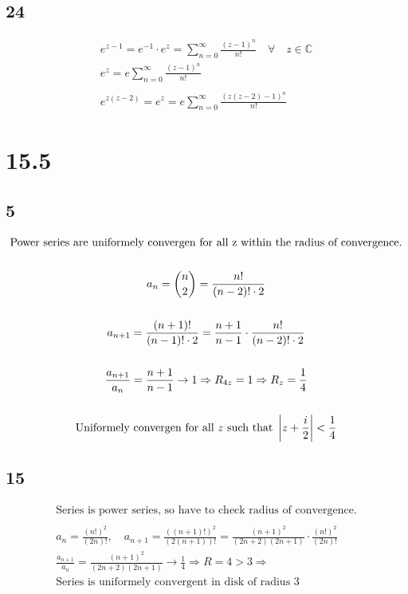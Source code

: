 \subsection*{24}


\begin{gather*}
	e^{z - 1} = e^{-1} \cdot e^z = \sum_{n = 0}^\infty{\frac{(z - 1)^n}{n!}} \quad \forall \quad z \in \mathbb{C}
	\\
	e^{z} = e \sum_{n = 0}^\infty{\frac{(z - 1)^n}{n!}}
	\\
	\\
	e^{z(z - 2)} = e^{z} = e \sum_{n = 0}^\infty{\frac{(z(z - 2) - 1)^n}{n!}}
\end{gather*}


\section*{15.5}

\subsection*{5}


\begin{gather*}
	\text{Power series are uniformely convergen for all z within the radius of convergence.}
	\\
	\\
	a_n = {n \choose 2} = \frac{n!}{(n - 2)! \cdot 2}
	\\
	\\
	a_{n + 1} = \frac{(n + 1)!}{(n - 1)! \cdot 2} = \frac{n + 1}{n - 1} \cdot \frac{n!}{(n - 2)! \cdot 2}
	\\
	\\
	\frac{a_{n + 1}}{a_n} = \frac{n + 1}{n - 1} \rightarrow 1 \Rightarrow R_{4 z} = 1 \Rightarrow R_z = \frac{1}{4}
	\\
	\\
	\text{Uniformely convergen for all } z \text{ such that } \left| z + \frac{i}{2} \right| < \frac{1}{4}
\end{gather*}


\subsection*{15}


\begin{gather*}
	\text{Series is power series, so have to check radius of convergence.}
	\\
	\\
	a_n = \frac{(n!)^2}{(2n)!},
	\quad
	a_{n + 1} = \frac{((n + 1)!)^2}{(2(n + 1))!} = \frac{(n + 1)^2}{(2n + 2)(2n + 1)} \cdot \frac{(n!)^2}{(2n)!}
	\\
	\frac{a_{n + 1}}{a_n} = \frac{(n + 1)^2}{(2n + 2)(2n + 1)} \rightarrow \frac{1}{4} \Rightarrow R = 4 > 3 \Rightarrow
	\\
	\text{Series is uniformely convergent in disk of radius 3}
\end{gather*}

